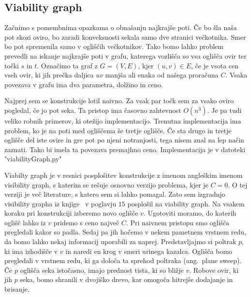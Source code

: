 \documentclass{article}
\begin{document}
\subsection*{Viability graph}

Začnimo s pomembnima opazkama o obnašanju najkrajše poti. Če bo šla naša pot skozi oviro, bo zaradi konveksnosti sekala samo dve stranici večkotnika. Smer bo pot spremenila samo v ogliščih večkotnikov. Tako bomo lahko problem prevedli na iskanje najkrajše poti v grafu, katerega vozlišča so vsa oglišča ovir ter točki $s$ in $t$. Označimo ta graf z $G = (V, E)$, kjer $(u,v) \in E$, če je vsota cen vseh ovir, ki jih prečka daljica $uv$ manjša ali enaka od našega proračuna $C$. Vsaka povezava v grafu ima dva parametra, dolžino in ceno. 

Najprej sem se konstrukcije lotil naivno. Za vsak par točk sem za vsako oviro pogledal, če jo pot seka. Ta pristop ima časovno zahtevnost $O(n^3)$. Je pa tudi veliko robnih primerov, ki otežijo implementacijo. Trenutna implementacija ima problem, ko je na poti med ogliščema še tretje oglišče. Če sta drugo in tretje oglišče del iste ovire in gre pot po njeni notranjosti, tega nisem znal na lep način zaznati. Tako bi imela ta povezava premajhno ceno. Implementacija je v datoteki "viabilityGraph.py"

Viabilty graph je v resnici posplošitev konstrukcije z imenom angleškim imenom visibility graph, s katerim se rešuje osnovno verzijo problema, kjer je $C = 0$. O tej verziji je več literature, s katero sem si lahko pomagal. Zato sem izgradnjo visibility grapha iz knjige~\cite{BCKO} v poglavju $15$ posplošil na viability graph. 
Na vsakem koraku pri konstrukciji izberemo novo oglišče $v$. Ugotoviti moramo, do katerih oglišč lahko iz $v$ pridemo s ceno največ $C$. Pri naivnem pristopu smo oglišča pregledali kakor so padla. Sedaj pa jih hočemo v nekem pametnem vrstnem redu, da bomo lahko nekaj informacij uporabili za naprej. Predstavljajmo si poltrak $p$, ki ima izhodišče v $v$ in naredi en krog v smeri urinega kazalca. Oglišča bomo pregledali v vrstnem redu, ki ga določa ta sprehod poltraka (ang.\ plane sweep). Če $p$ oglišča seka istočasno, imajo prednost tista, ki so bližje $v$.
Robove ovir, ki jih $p$ seka, bomo shranili v dvojiško drevo, kar omogoča hitrejše dodajanje in brisanje.
\end{document}
